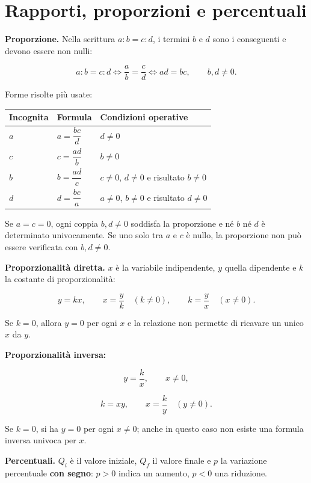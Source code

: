 \section{Rapporti, proporzioni e percentuali}\label{rapporti-proporzioni-e-percentuali}

\textbf{Proporzione.} Nella scrittura \(a:b=c:d\), i termini \(b\) e \(d\) sono i conseguenti e devono essere non nulli:

\[
a:b=c:d
\Longleftrightarrow
\frac ab=\frac cd
\Longleftrightarrow
ad=bc,
\qquad b,d\ne0.
\]

Forme risolte più usate:

\begin{longtable}[]{@{}lll@{}}
\toprule\noalign{}
Incognita & Formula & Condizioni operative \\
\midrule\noalign{}
\endhead
\bottomrule\noalign{}
\endlastfoot
\(a\) & \(a=\dfrac{bc}{d}\) & \(d\ne0\) \\
\(c\) & \(c=\dfrac{ad}{b}\) & \(b\ne0\) \\
\(b\) & \(b=\dfrac{ad}{c}\) & \(c\ne0\), \(d\ne0\) e risultato \(b\ne0\) \\
\(d\) & \(d=\dfrac{bc}{a}\) & \(a\ne0\), \(b\ne0\) e risultato \(d\ne0\) \\
\end{longtable}

Se \(a=c=0\), ogni coppia \(b,d\ne0\) soddisfa la proporzione e né \(b\) né \(d\) è determinato univocamente. Se uno solo tra \(a\) e \(c\) è nullo, la proporzione non può essere verificata con \(b,d\ne0\).

\textbf{Proporzionalità diretta.} \(x\) è la variabile indipendente, \(y\) quella dipendente e \(k\) la costante di proporzionalità:

\[
y=kx,
\qquad
x=\frac yk\quad(k\ne0),
\qquad
k=\frac yx\quad(x\ne0).
\]

Se \(k=0\), allora \(y=0\) per ogni \(x\) e la relazione non permette di ricavare un unico \(x\) da \(y\).

\textbf{Proporzionalità inversa:}

\[
y=\frac kx,
\qquad x\ne0,
\]

\[
k=xy,
\qquad
x=\frac ky\quad(y\ne0).
\]

Se \(k=0\), si ha \(y=0\) per ogni \(x\ne0\); anche in questo caso non esiste una formula inversa univoca per \(x\).

\textbf{Percentuali.} \(Q_i\) è il valore iniziale, \(Q_f\) il valore finale e \(p\) la variazione percentuale \textbf{con segno}: \(p>0\) indica un aumento, \(p<0\) una riduzione.

